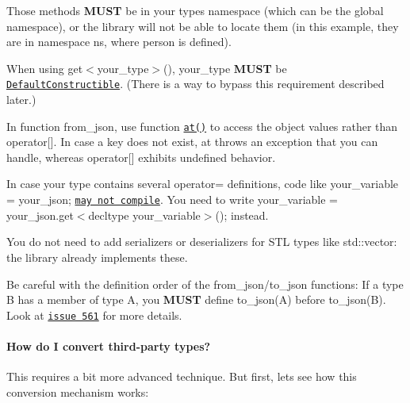 \begin{DoxyItemize}
\item Those methods {\bfseries M\+U\+ST} be in your type\textquotesingle{}s namespace (which can be the global namespace), or the library will not be able to locate them (in this example, they are in namespace {\ttfamily ns}, where {\ttfamily person} is defined).
\item When using {\ttfamily get$<$your\+\_\+type$>$()}, {\ttfamily your\+\_\+type} {\bfseries M\+U\+ST} be \href{http://en.cppreference.com/w/cpp/concept/DefaultConstructible}{\tt Default\+Constructible}. (There is a way to bypass this requirement described later.)
\item In function {\ttfamily from\+\_\+json}, use function \href{https://nlohmann.github.io/json/classnlohmann_1_1basic__json_a93403e803947b86f4da2d1fb3345cf2c.html#a93403e803947b86f4da2d1fb3345cf2c}{\tt {\ttfamily at()}} to access the object values rather than {\ttfamily operator\mbox{[}\mbox{]}}. In case a key does not exist, {\ttfamily at} throws an exception that you can handle, whereas {\ttfamily operator\mbox{[}\mbox{]}} exhibits undefined behavior.
\item In case your type contains several {\ttfamily operator=} definitions, code like {\ttfamily your\+\_\+variable = your\+\_\+json;} \href{https://github.com/nlohmann/json/issues/667}{\tt may not compile}. You need to write {\ttfamily your\+\_\+variable = your\+\_\+json.\+get$<$decltype your\+\_\+variable$>$();} instead.
\item You do not need to add serializers or deserializers for S\+TL types like {\ttfamily std\+::vector}\+: the library already implements these.
\item Be careful with the definition order of the {\ttfamily from\+\_\+json}/{\ttfamily to\+\_\+json} functions\+: If a type {\ttfamily B} has a member of type {\ttfamily A}, you {\bfseries M\+U\+ST} define {\ttfamily to\+\_\+json(\+A)} before {\ttfamily to\+\_\+json(\+B)}. Look at \href{https://github.com/nlohmann/json/issues/561}{\tt issue 561} for more details.
\end{DoxyItemize}

\paragraph*{How do I convert third-\/party types?}

This requires a bit more advanced technique. But first, let\textquotesingle{}s see how this conversion mechanism works\+:

